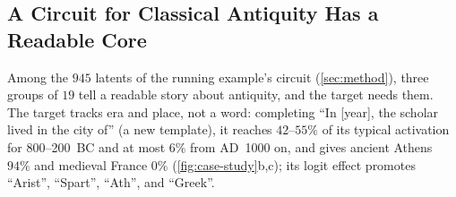 \documentclass[10pt]{article}
\begin{document}
\subsection{A Circuit for Classical Antiquity Has a Readable Core}
\label{sec:case-study}

Among the $945$ latents of the running example's circuit (\cref{sec:method}), three groups of $19$ tell a readable story about antiquity, and the target needs them.
The target tracks era and place, not a word: completing ``In [year], the scholar lived in the city of'' (a new template), it reaches $42$--$55\%$ of its typical activation for 800--200~BC and at most $6\%$ from AD~1000 on, and gives ancient Athens $94\%$ and medieval France $0\%$ (\cref{fig:case-study}b,c); its logit effect promotes ``Arist'', ``Spart'', ``Ath'', and ``Greek''.
\end{document}
